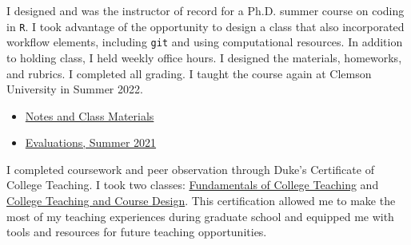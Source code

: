 I designed and was the instructor of record for a Ph.D. summer course on coding in \texttt{R}. I took advantage of the opportunity to design a class that also incorporated workflow elements, including \texttt{git} and using computational resources. In addition to holding class, I held weekly office hours. I designed the materials, homeworks, and rubrics. I completed all grading. I taught the course again at Clemson University in Summer 2022.

\begin{itemize}
    \item \href{https://github.com/aziff/R-Workflow-for-Economists}{Notes and Class Materials}
    \item \href{https://www.dropbox.com/s/f8fystdpnxc6don/Ziff_Anna_Econ%20890.pdf?dl=0}{Evaluations, Summer 2021}
\end{itemize}

I completed coursework and peer observation through Duke's Certificate of College Teaching. I took two classes: \href{https://gradschool.duke.edu/professional-development/programs/certificate-college-teaching/coursework-teaching/gs750/}{Fundamentals of College Teaching} and \href{https://gradschool.duke.edu/professional-development/programs/certificate-college-teaching/coursework-teaching/gs755-college/}{College Teaching and Course Design}. This certification allowed me to make the most of my teaching experiences during graduate school and equipped me with tools and resources for future teaching opportunities.
















